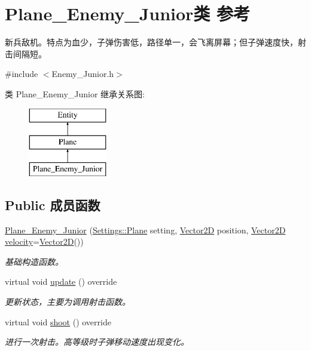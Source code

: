 \hypertarget{class_plane___enemy___junior}{}\section{Plane\+\_\+\+Enemy\+\_\+\+Junior类 参考}
\label{class_plane___enemy___junior}


新兵敌机。特点为血少，子弹伤害低，路径单一，会飞离屏幕；但子弹速度快，射击间隔短。  




{\ttfamily \#include $<$Enemy\+\_\+\+Junior.\+h$>$}

类 Plane\+\_\+\+Enemy\+\_\+\+Junior 继承关系图\+:\begin{figure}[H]
\begin{center}
\leavevmode
\includegraphics[height=3.000000cm]{class_plane___enemy___junior}
\end{center}
\end{figure}
\subsection*{Public 成员函数}
\begin{DoxyCompactItemize}
\item 
\mbox{\label{class_plane___enemy___junior_a2a6b4a6903c05789e8be98d2d11a927d}} 
\hyperlink{class_plane___enemy___junior_a2a6b4a6903c05789e8be98d2d11a927d}{Plane\+\_\+\+Enemy\+\_\+\+Junior} (\hyperlink{struct_settings_1_1_plane}{Settings\+::\+Plane} setting, \hyperlink{structbasic__vector2_d}{Vector2D} position, \hyperlink{structbasic__vector2_d}{Vector2D} \hyperlink{class_entity_a386d25b56772b8913eb3e5adc636f6e0}{velocity}=\hyperlink{structbasic__vector2_d}{Vector2D}())
\begin{DoxyCompactList}\small\item\em 基础构造函数。 \end{DoxyCompactList}\item 
\mbox{\label{class_plane___enemy___junior_a262143737ed740f65063dbcbc5970f55}} 
virtual void \hyperlink{class_plane___enemy___junior_a262143737ed740f65063dbcbc5970f55}{update} () override
\begin{DoxyCompactList}\small\item\em 更新状态，主要为调用射击函数。 \end{DoxyCompactList}\item 
virtual void \hyperlink{class_plane___enemy___junior_a5ffc4150cdf4c6e81480a2977d4bfafe}{shoot} () override
\begin{DoxyCompactList}\small\item\em 进行一次射击。高等级时子弹移动速度出现变化。 \end{DoxyCompactList}\end{DoxyCompactItemize}
